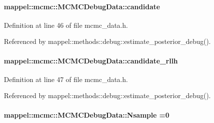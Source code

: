 \paragraph[{\texorpdfstring{candidate}{candidate}}]{ mappel\+::mcmc\+::\+M\+C\+M\+C\+Debug\+Data\+::candidate}\hypertarget{structmappel_1_1mcmc_1_1MCMCDebugData_a62424ee51a10b39b9245945743761c27}{}\label{structmappel_1_1mcmc_1_1MCMCDebugData_a62424ee51a10b39b9245945743761c27}


Definition at line 46 of file mcmc\+\_\+data.\+h.



Referenced by mappel\+::methods\+::debug\+::estimate\+\_\+posterior\+\_\+debug().

\paragraph[{\texorpdfstring{candidate\+\_\+rllh}{candidate_rllh}}]{ mappel\+::mcmc\+::\+M\+C\+M\+C\+Debug\+Data\+::candidate\+\_\+rllh}\hypertarget{structmappel_1_1mcmc_1_1MCMCDebugData_a554ee027879c8bad30bcc637ec88b113}{}\label{structmappel_1_1mcmc_1_1MCMCDebugData_a554ee027879c8bad30bcc637ec88b113}


Definition at line 47 of file mcmc\+\_\+data.\+h.



Referenced by mappel\+::methods\+::debug\+::estimate\+\_\+posterior\+\_\+debug().

\paragraph[{\texorpdfstring{Nsample}{Nsample}}]{ mappel\+::mcmc\+::\+M\+C\+M\+C\+Debug\+Data\+::\+Nsample =0}\hypertarget{structmappel_1_1mcmc_1_1MCMCDebugData_ad001804f5adce124355dbd6ded691d7f}{}\label{structmappel_1_1mcmc_1_1MCMCDebugData_ad001804f5adce124355dbd6ded691d7f}


